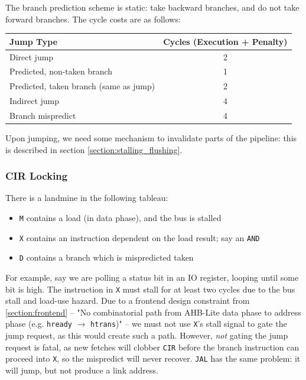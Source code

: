 \documentclass[notitlepage]{article}
\begin{document}
The branch prediction scheme is static: take backward branches, and do not take forward branches. The cycle costs are as follows:

\begin{center}
\begin{tabular}{l c}
\hline
Jump Type & Cycles (Execution + Penalty) \\
\hline
Direct jump & 2 \\
Predicted, non-taken branch & 1 \\
Predicted, taken branch (same as jump) & 2 \\
Indirect jump & 4 \\
Branch mispredict & 4 \\
\hline
\end{tabular}
\end{center}

Upon jumping, we need some mechanism to invalidate parts of the pipeline: this is described in section \ref{section:stalling_flushing}.

\subsubsection{CIR Locking}

There is a landmine in the following tableau:

\begin{itemize}
	\item {\tt M} contains a load (in data phase), and the bus is stalled
	\item {\tt X} contains an instruction dependent on the load result; say an {\tt AND}
	\item {\tt D} contains a branch which is mispredicted taken
\end{itemize}

For example, say we are polling a status bit in an IO register, looping until some bit is high. The instruction in {\tt X} must stall for at least two cycles due to the bus stall and load-use hazard. Due to a frontend design constraint from \ref{section:frontend} -- "No combinatorial path from AHB-Lite data phase to address phase (e.g. {\tt hready} $\to$ {\tt htrans})" -- we must not use {\tt X}'s stall signal to gate the jump request, as this would create such a path. However, {\it not} gating the jump request is fatal, as new fetches will clobber {\tt CIR} before the branch instruction can proceed into {\tt X}, so the mispredict will never recover. {\tt JAL} has the same problem: it will jump, but not produce a link address.
\end{document}
